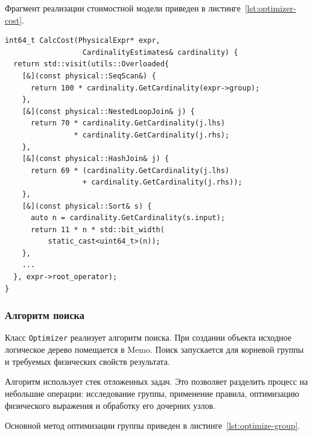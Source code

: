 \documentclass[fontsize=14pt, russian]{scrartcl}
\begin{document}
Фрагмент реализации стоимостной модели приведен в
листинге~\ref{lst:optimizer-cost}.

\begin{listing}[H]
  \caption{Вычисление локальной стоимости физических операторов.}
  \label{lst:optimizer-cost}
  \begin{verbatim}
int64_t CalcCost(PhysicalExpr* expr,
                  CardinalityEstimates& cardinality) {
  return std::visit(utils::Overloaded{
    [&](const physical::SeqScan&) {
      return 100 * cardinality.GetCardinality(expr->group);
    },
    [&](const physical::NestedLoopJoin& j) {
      return 70 * cardinality.GetCardinality(j.lhs)
                * cardinality.GetCardinality(j.rhs);
    },
    [&](const physical::HashJoin& j) {
      return 69 * (cardinality.GetCardinality(j.lhs)
                  + cardinality.GetCardinality(j.rhs));
    },
    [&](const physical::Sort& s) {
      auto n = cardinality.GetCardinality(s.input);
      return 11 * n * std::bit_width(
          static_cast<uint64_t>(n));
    },
    ...
  }, expr->root_operator);
}
  \end{verbatim}
\end{listing}

\subsubsection{Алгоритм поиска}

Класс \verb|Optimizer| реализует алгоритм поиска. При создании объекта исходное
логическое дерево помещается в Memo. Поиск запускается для корневой группы и
требуемых физических свойств результата.

Алгоритм использует стек отложенных задач. Это позволяет разделить процесс на
небольшие операции: исследование группы, применение правила, оптимизацию
физического выражения и обработку его дочерних узлов.

Основной метод оптимизации группы приведен в
листинге~\ref{lst:optimize-group}.
\end{document}
